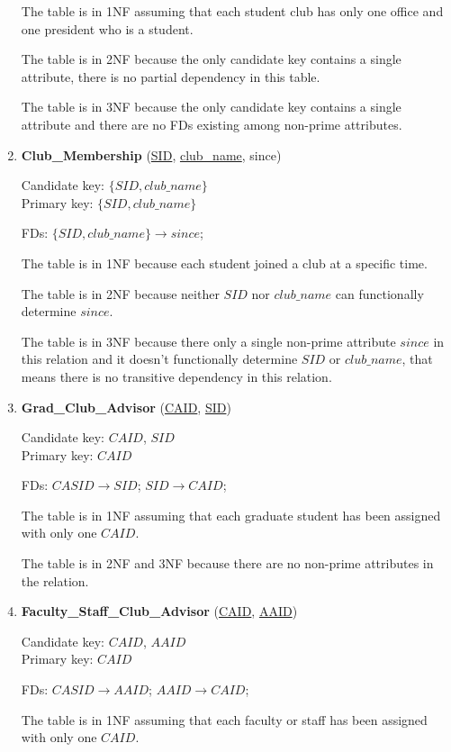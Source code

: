 \documentclass[10pt]{article}
\begin{document}
\begin{enumerate}
  The table is in 1NF assuming that each student club has only one
  office and one president who is a student.

  The table is in 2NF because the only candidate key contains a single
  attribute, there is no partial dependency in this table.

  The table is in 3NF because the only candidate key contains a single
  attribute and there are no FDs existing among non-prime attributes.

\item \textbf{Club\_Membership} (\underline{SID},
  \underline{club\_name}, since)

  Candidate key: $\{SID, club\_name\}$\\
  Primary key: $\{SID, club\_name\}$

  FDs: $\{SID, club\_name\} \rightarrow since$;

  The table is in 1NF because each student joined a club at a specific
  time.

  The table is in 2NF because neither $SID$ nor $club\_name$ can
  functionally determine $since$.

  The table is in 3NF because there only a single non-prime
  attribute $since$ in this relation and it doesn't functionally
  determine $SID$ or $club\_name$, that means there is no transitive
  dependency in this relation.

\item \textbf{Grad\_Club\_Advisor} (\underline{CAID},
  \underline{SID})
  
  Candidate key: $CAID$, $SID$\\
  Primary key: $CAID$

  FDs: $CASID \rightarrow SID$; $SID \rightarrow CAID$;

  The table is in 1NF assuming that each graduate student has been
  assigned with only one $CAID$.

  The table is in 2NF and 3NF because there are no non-prime
  attributes in the relation.

\item \textbf{Faculty\_Staff\_Club\_Advisor} (\underline{CAID},
  \underline{AAID})

  Candidate key: $CAID$, $AAID$\\
  Primary key: $CAID$

  FDs: $CASID \rightarrow AAID$; $AAID \rightarrow CAID$;

  The table is in 1NF assuming that each faculty or staff has been
  assigned with only one $CAID$.


\end{enumerate}
\end{document}
